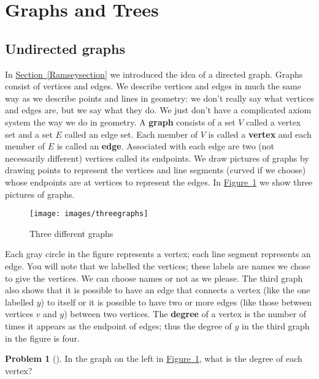 \documentclass[10pt,]{book}
\newcommand{\terminology}[1]{\textbf{#1}}
\theoremstyle{plain}
\theoremstyle{definition}
\newtheorem{activity}[project]{Problem}
\theoremstyle{definition}
\numberwithin{equation}{chapter}
\begin{document}
\section[{Graphs and Trees}]{Graphs and Trees}\label{sec_induction-graphstrees}
\typeout{************************************************}
\typeout{************************************************}
\subsection[{Undirected graphs}]{Undirected graphs}\label{graphsection}
\hypertarget{p-592}{}%
In \hyperref[Ramseysection]{Section~\ref{Ramseysection}} we introduced the idea of a directed graph. Graphs consist of vertices and edges. We describe vertices and edges in much the same way as we describe points and lines in geometry: we don't really say what vertices and edges are, but we say what they do. We just don't have a complicated axiom system the way we do in geometry. A \terminology{graph} consists of a set \(V\) called a vertex set and a set \(E\) called an edge set. Each member of \(V\) is called a \terminology{vertex} and each member of \(E\) is called an \terminology{edge}. Associated with each edge are two (not necessarily different) vertices called its endpoints. We draw pictures of graphs by drawing points to represent the vertices and line segments (curved if we choose) whose endpoints are at vertices to represent the edges. In \hyperref[Threegraphs]{Figure~\ref{Threegraphs}} we show three pictures of graphs.%
\begin{figure}
\centering
\texttt{[image: images/threegraphs]}
\caption{Three different graphs\label{Threegraphs}}
\end{figure}
\hypertarget{p-593}{}%
Each gray circle in the figure represents a vertex; each line segment represents an edge. You will note that we labelled the vertices; these labels are names we chose to give the vertices. We can choose names or not as we please. The third graph also shows that it is possible to have an edge that connects a vertex (like the one labelled \(y\)) to itself or it is possible to have two or more edges (like those between vertices \(v\) and \(y\)) between two vertices. The \terminology{degree} of a vertex is the number of times it appears as the endpoint of edges; thus the degree of \(y\) in the third graph in the figure is four.%
\begin{activity}[] \label{activity-100}
\hypertarget{p-594}{}%
In the graph on the left in \hyperref[Threegraphs]{Figure~\ref{Threegraphs}}, what is the degree of each vertex?%
\end{activity}
\end{document}
